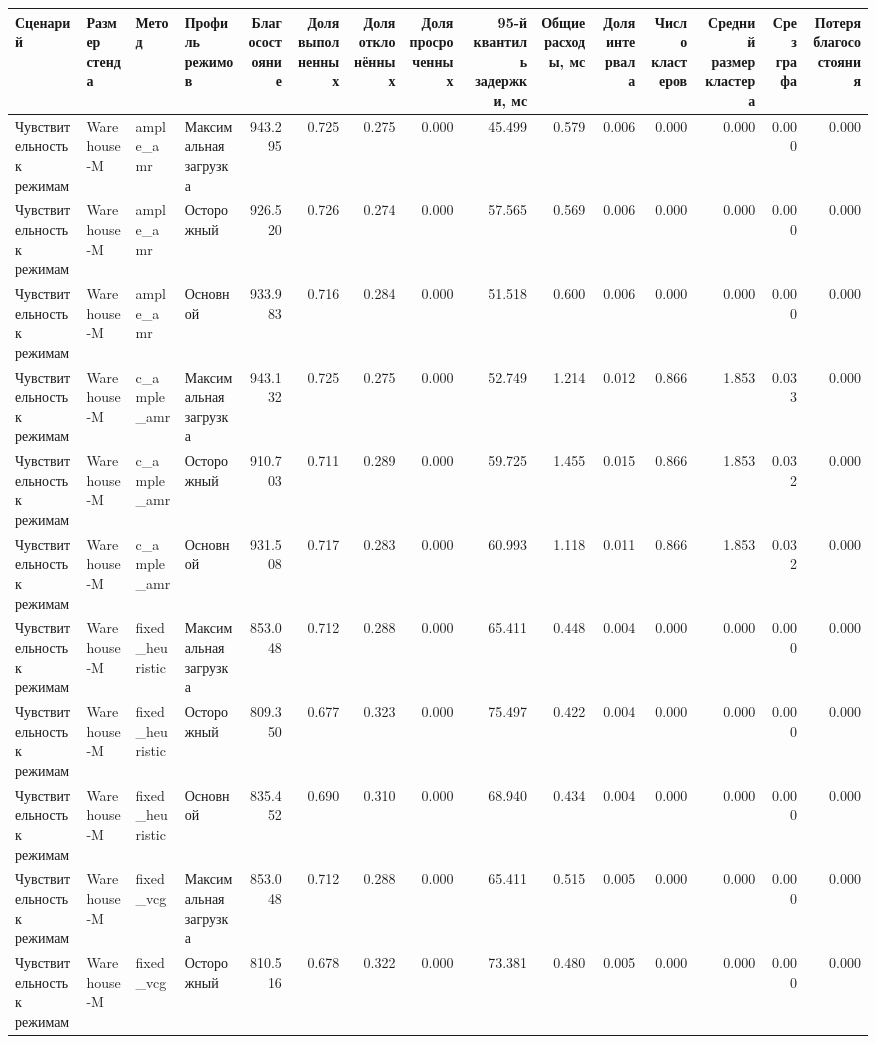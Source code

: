 \begin{tabular}{llllrrrrrrrrrrr}
\toprule
 Сценарий & Размер стенда & Метод & Профиль режимов & Благосостояние & Доля выполненных & Доля отклонённых & Доля просроченных & 95-й квантиль задержки, мс & Общие расходы, мс & Доля интервала & Число кластеров & Средний размер кластера & Срез графа & Потеря благосостояния \\
\midrule
 Чувствительность к режимам & Warehouse-M & ample_amr & Максимальная загрузка & 943.295 & 0.725 & 0.275 & 0.000 & 45.499 & 0.579 & 0.006 & 0.000 & 0.000 & 0.000 & 0.000 \\
 Чувствительность к режимам & Warehouse-M & ample_amr & Осторожный & 926.520 & 0.726 & 0.274 & 0.000 & 57.565 & 0.569 & 0.006 & 0.000 & 0.000 & 0.000 & 0.000 \\
 Чувствительность к режимам & Warehouse-M & ample_amr & Основной & 933.983 & 0.716 & 0.284 & 0.000 & 51.518 & 0.600 & 0.006 & 0.000 & 0.000 & 0.000 & 0.000 \\
 Чувствительность к режимам & Warehouse-M & c_ample_amr & Максимальная загрузка & 943.132 & 0.725 & 0.275 & 0.000 & 52.749 & 1.214 & 0.012 & 0.866 & 1.853 & 0.033 & 0.000 \\
 Чувствительность к режимам & Warehouse-M & c_ample_amr & Осторожный & 910.703 & 0.711 & 0.289 & 0.000 & 59.725 & 1.455 & 0.015 & 0.866 & 1.853 & 0.032 & 0.000 \\
 Чувствительность к режимам & Warehouse-M & c_ample_amr & Основной & 931.508 & 0.717 & 0.283 & 0.000 & 60.993 & 1.118 & 0.011 & 0.866 & 1.853 & 0.032 & 0.000 \\
 Чувствительность к режимам & Warehouse-M & fixed_heuristic & Максимальная загрузка & 853.048 & 0.712 & 0.288 & 0.000 & 65.411 & 0.448 & 0.004 & 0.000 & 0.000 & 0.000 & 0.000 \\
 Чувствительность к режимам & Warehouse-M & fixed_heuristic & Осторожный & 809.350 & 0.677 & 0.323 & 0.000 & 75.497 & 0.422 & 0.004 & 0.000 & 0.000 & 0.000 & 0.000 \\
 Чувствительность к режимам & Warehouse-M & fixed_heuristic & Основной & 835.452 & 0.690 & 0.310 & 0.000 & 68.940 & 0.434 & 0.004 & 0.000 & 0.000 & 0.000 & 0.000 \\
 Чувствительность к режимам & Warehouse-M & fixed_vcg & Максимальная загрузка & 853.048 & 0.712 & 0.288 & 0.000 & 65.411 & 0.515 & 0.005 & 0.000 & 0.000 & 0.000 & 0.000 \\
 Чувствительность к режимам & Warehouse-M & fixed_vcg & Осторожный & 810.516 & 0.678 & 0.322 & 0.000 & 73.381 & 0.480 & 0.005 & 0.000 & 0.000 & 0.000 & 0.000 \\

\end{tabular}
